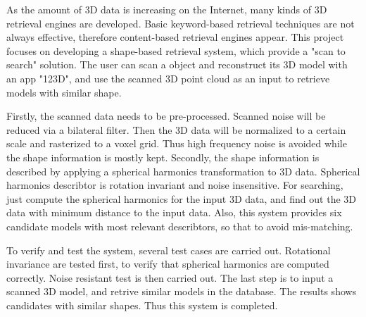 As the amount of 3D data is increasing on the Internet, many kinds of 3D retrieval engines are developed. Basic keyword-based retrieval techniques are not always effective, therefore content-based retrieval engines appear. This project focuses on developing a shape-based retrieval system, which provide a "scan to search" solution. The user can scan a object and reconstruct its 3D model with an app "123D", and use the scanned 3D point cloud as an input to retrieve models with similar shape. 

Firstly, the scanned data needs to be pre-processed. Scanned noise will be reduced via a bilateral filter. Then the 3D data will be normalized to a certain scale and rasterized to a voxel grid. Thus high frequency noise is avoided while the shape information is mostly kept. Secondly, the shape information is described by applying a spherical harmonics transformation to 3D data. Spherical harmonics describtor is rotation invariant and noise insensitive. For searching, just compute the spherical harmonics for the input 3D data, and find out the 3D data with minimum distance to the input data. Also, this system provides six candidate models with most relevant describtors, so that to avoid mis-matching. 

To verify and test the system, several test cases are carried out. Rotational invariance are tested first, to verify that spherical harmonics are computed correctly. Noise resistant test is then carried out. The last step is to input a scanned 3D model, and retrive similar models in the database. The results shows candidates with similar shapes. Thus this system is completed.